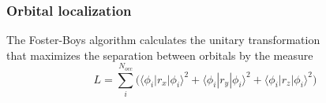 \begin{frame}
    \frametitle{Orbital localization}
    \centering
    The Foster-Boys algorithm calculates the unitary transformation \\
    that maximizes the separation between orbitals by the measure
    \begin{equation}
	\nonumber
	L = \sum_{i}^{N_{occ}} \Big(
		\langle\phi_i|r_x|\phi_i\rangle^2 + 
		\langle\phi_i|r_y|\phi_i\rangle^2 + 
		\langle\phi_i|r_z|\phi_i\rangle^2 \Big)
    \end{equation}
    \begin{columns}
    \begin{column}[b]{0.48\linewidth}
    \begin{center}

\end{center}
\end{column}
\end{columns}
\end{frame}
